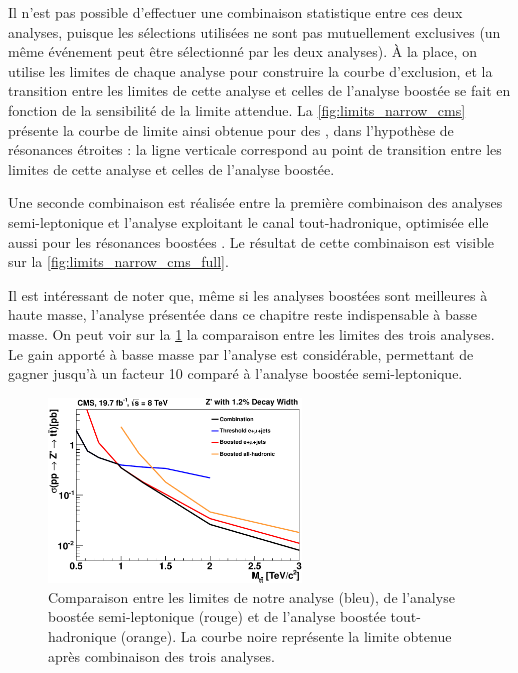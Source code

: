 Il n'est pas possible d'effectuer une combinaison statistique entre ces deux analyses, puisque les sélections utilisées ne sont pas mutuellement exclusives (un même événement peut être sélectionné par les deux analyses). À la place, on utilise les limites de chaque analyse pour construire la courbe d'exclusion, et la transition entre les limites de cette analyse et celles de l'analyse boostée se fait en fonction de la sensibilité de la limite attendue. La \cref{fig:limits_narrow_cms} présente la courbe de limite ainsi obtenue pour des \zprime, dans l'hypothèse de résonances étroites : la ligne verticale correspond au point de transition entre les limites de cette analyse et celles de l'analyse boostée.

Une seconde combinaison est réalisée entre la première combinaison des analyses semi-leptonique et l'analyse exploitant le canal tout-hadronique, optimisée elle aussi pour les résonances boostées \citep{Chatrchyan:1599045}. Le résultat de cette combinaison est visible sur la \cref{fig:limits_narrow_cms_full}.

Il est intéressant de noter que, même si les analyses boostées sont meilleures à haute masse, l'analyse présentée dans ce chapitre reste indispensable à basse masse. On peut voir sur la \cref{fig:limits_comp} la comparaison entre les limites des trois analyses. Le gain apporté à basse masse par l'analyse est considérable, permettant de gagner jusqu'à un facteur 10 comparé à l'analyse boostée semi-leptonique.

\begin{figure}[tbp]
  \centering
  \includegraphics[width=0.6\textwidth]{chapitre7/figs/limit_comparison_narrow_resonances.pdf}
  \caption{Comparaison entre les limites de notre analyse (bleu), de l'analyse boostée semi-leptonique (rouge) et de l'analyse boostée tout-hadronique (orange). La courbe noire représente la limite obtenue après combinaison des trois analyses.}
  \label{fig:limits_comp}
\end{figure}

